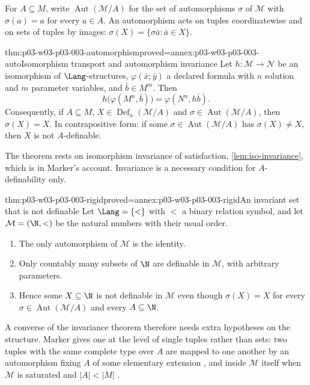 For \(A\subseteq M\), write \(\operatorname{Aut}(\mathcal M/A)\) for the set
of automorphisms \(\sigma\) of \(\mathcal M\) with \(\sigma(a)=a\) for every
\(a\in A\).  An automorphism acts on tuples coordinatewise and on sets of
tuples by images: \(\sigma(X)=\{\sigma\bar a:\bar a\in X\}\).

\begin{hbtheorem}{thm:p03-w03-p03-003-automorphism}{proved=annex:p03-w03-p03-003-auto}{Isomorphism transport and automorphism invariance}
Let \(h:\mathcal M\to\mathcal N\) be an isomorphism of \(\Lang\)-structures,
\(\varphi(\bar x;\bar y)\) a declared formula with \(n\) solution and \(m\)
parameter variables, and \(\bar b\in M^m\).  Then
\[
 h\bigl(\varphi(M^n,\bar b)\bigr)=\varphi(N^n,h\bar b).
\]
Consequently, if \(A\subseteq M\), \(X\in\operatorname{Def}_n(\mathcal M/A)\)
and \(\sigma\in\operatorname{Aut}(\mathcal M/A)\), then \(\sigma(X)=X\).  In
contrapositive form: if some \(\sigma\in\operatorname{Aut}(\mathcal M/A)\)
has \(\sigma(X)\neq X\), then \(X\) is not \(A\)-definable.
\end{hbtheorem}

The theorem rests on isomorphism invariance of satisfaction,
\cref{lem:iso-invariance}, which is \cite[Proposition~1.2, p.~17]{Marker2000IntroductionModelTheory}
in Marker's account.  Invariance is a necessary condition for
\(A\)-definability only.

\begin{hbtheorem}{thm:p03-w03-p03-003-rigid}{proved=annex:p03-w03-p03-003-rigid}{An invariant set that is not definable}
Let \(\Lang=\{<\}\) with \(<\) a binary relation symbol, and let
\(\mathcal M=(\N,<)\) be the natural numbers with their usual order.
\begin{enumerate}
 \item The only automorphism of \(\mathcal M\) is the identity.
 \item Only countably many subsets of \(\N\) are definable in \(\mathcal M\),
       with arbitrary parameters.
 \item Hence some \(X\subseteq\N\) is not definable in \(\mathcal M\) even
       though \(\sigma(X)=X\) for every \(\sigma\in\operatorname{Aut}
       (\mathcal M/A)\) and every \(A\subseteq\N\).
\end{enumerate}
\end{hbtheorem}

A converse of the invariance theorem therefore needs extra hypotheses on the
structure.  Marker gives one at the level of single tuples rather than sets:
two tuples with the same complete type over \(A\) are mapped to one another
by an automorphism fixing \(A\) of some elementary extension
\cite[Proposition~5.1, p.~28]{Marker2000IntroductionModelTheory}, and inside
\(\mathcal M\) itself when \(\mathcal M\) is saturated and \(\lvert A\rvert<
\lvert M\rvert\) \cite[Lemma~6.2, p.~30]{Marker2000IntroductionModelTheory}.

